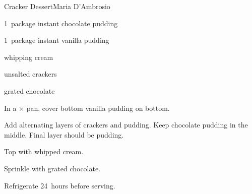 \begin{recipe}{Cracker Dessert}{Maria D'Ambrosio}{}

\begin{ingredients}
\item 1~package instant chocolate pudding
\item 1~package instant vanilla pudding
\item {} whipping cream
\item unsalted crackers
\item grated chocolate
\end{ingredients}

\begin{directions}
\item In a $\times$ pan, cover bottom vanilla pudding on bottom.
\item Add alternating layers of crackers and pudding. Keep chocolate pudding in the middle. Final layer should be pudding.
\item Top with whipped cream.
\item Sprinkle with grated chocolate.
\item Refrigerate 24~hours before serving.
\end{directions}

\end{recipe}
